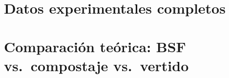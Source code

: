\documentclass[10pt,spanish,fleqn,openany,twoside,letterpaper]{book}
\begin{document}
\chapter{Datos experimentales completos}
% 

\chapter{Comparación teórica: BSF vs.\ compostaje vs.\ vertido}
% 



\setlength{\parskip}{0.5em} 
\pagestyle{plain}
\renewcommand{\bibfont}{\scriptsize}
\printbibliography
\end{document}
